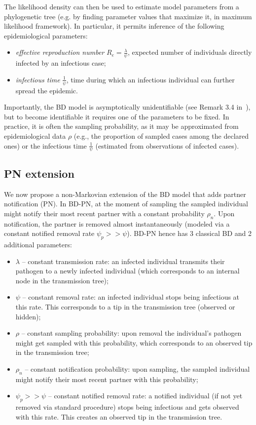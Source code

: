 \documentclass[a4paper,10pt]{article}
\begin{document}
The likelihood density can then be used to estimate model parameters from a phylogenetic tree (e.g. by finding parameter values that maximize it, in maximum likelihood framework). In particular, it permits inference of the following epidemiological parameters: 

\begin{itemize}
\item \textit{effective reproduction number} $R_e = \frac{\lambda}{\psi}$, expected number of individuals directly infected by an infectious case;
\item \textit{infectious time} $\frac{1}{\psi}$, time during which an infectious individual can further spread the epidemic.
\end{itemize} 

Importantly, the BD model is asymptotically unidentifiable (see Remark 3.4 in~\citep{Stadler2009}), but to become identifiable it requires one of the parameters to be fixed. In practice, it is often the sampling probability, as it may be approximated from epidemiological data $\rho$ (e.g., the proportion of sampled cases among the declared ones) or the infectious time $\frac{1}{\psi}$ (estimated from observations of infected cases). 


\subsection{PN extension}

We now propose a non-Markovian extension of the BD model that adds partner notification (PN).  In BD-PN, at the moment of sampling the sampled individual might notify their most recent partner with a constant probability $\rho_n$. Upon notification, the partner is removed almost instantaneously (modeled via a constant notified removal rate $\psi_p >> \psi$). BD-PN hence has 3 classical BD and 2 additional parameters:
\begin{itemize}
 \item $\lambda$ -- constant transmission rate: an infected individual transmits their pathogen to a newly infected individual (which corresponds to an internal node in the transmission tree);
 \item $\psi$ -- constant removal rate: an infected individual stops being infectious at this rate. This corresponds to a tip in the transmission tree (observed or hidden);
 \item $\rho$ -- constant sampling probability: upon removal the individual's pathogen might get sampled with this probability, which corresponds to an observed tip in the transmission tree;
 \item $\rho_n$ -- constant notification probability: upon sampling, the sampled individual might notify their most recent partner with this probability;
 \item $\psi_p >> \psi$ -- constant notified removal rate: a notified individual (if not yet removed via standard procedure) stops being infectious and gets observed with this rate. This creates an observed tip in the transmission tree.
\end{itemize}
\end{document}
